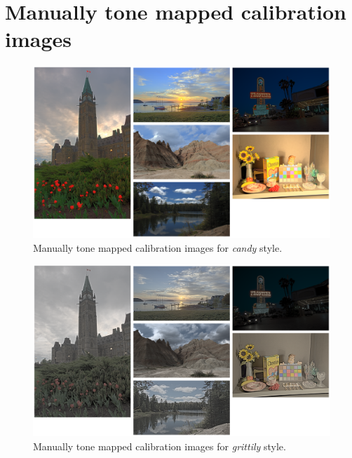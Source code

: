 \appendix
\chapter{Manually tone mapped calibration images}
\label{app:calib}

\begin{figure}
\begin{center}
\includegraphics[width=\textwidth]{appendix2/calibimg_candy.pdf}
\caption{Manually tone mapped calibration images for \emph{candy} style.}
\label{fig:gallery}
\end{center}
\end{figure}

\begin{figure}
\begin{center}
\includegraphics[width=\textwidth]{appendix2/calibimg_grittily.pdf}
\caption{Manually tone mapped calibration images for \emph{grittily} style.}
\label{fig:gallery}
\end{center}
\end{figure}

